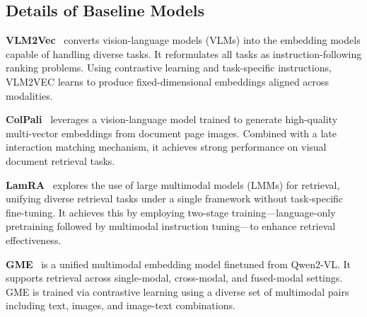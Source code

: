 \subsection{Details of Baseline Models}
\label{sec::appendix_baseline}


\textbf{VLM2Vec}~\citep{vlm2vec} converts vision-language models (VLMs) into the embedding models capable of handling diverse tasks. It reformulates all tasks as instruction-following ranking problems. Using contrastive learning and task-specific instructions, VLM2VEC learns to produce fixed-dimensional embeddings aligned across modalities. 


\textbf{ColPali}~\citep{colpali} leverages a vision-language model trained to generate high-quality multi-vector embeddings from document page images. Combined with a late interaction matching mechanism, it achieves strong performance on visual document retrieval tasks.

\textbf{LamRA}~\citep{lamra} explores the use of large multimodal models (LMMs) for retrieval, unifying diverse retrieval tasks under a single framework without task-specific fine-tuning. It achieves this by employing two-stage training—language-only pretraining followed by multimodal instruction tuning—to enhance retrieval effectiveness. 


\textbf{GME}~\citep{gme} is a unified multimodal embedding model finetuned from Qwen2-VL. It supports retrieval across single-modal, cross-modal, and fused-modal settings. GME is trained via contrastive learning using a diverse set of multimodal pairs including text, images, and image-text combinations.






